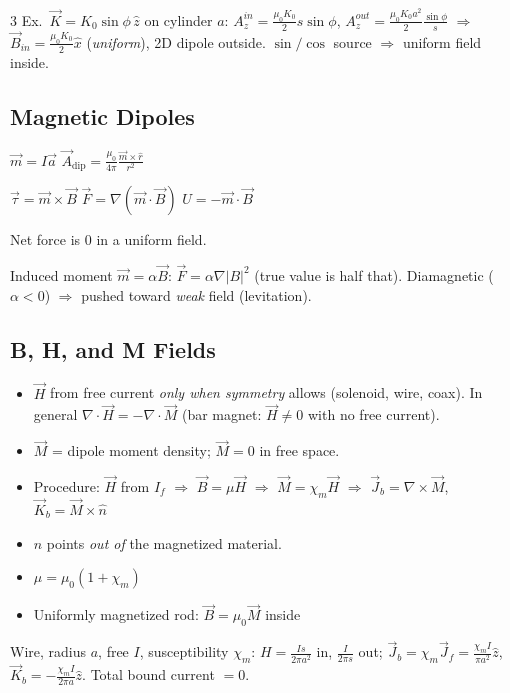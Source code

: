 \documentclass[11pt]{article}
\newcommand{\warn}[1]{\textcolor{red!70!black}{#1}}
\begin{document}
\begin{multicols*}{3}
Ex.\ $\vec K=K_0\sin\phi\,\hat z$ on cylinder $a$: $A_z^{in}=\frac{\mu_0K_0}{2}s\sin\phi$, $A_z^{out}=\frac{\mu_0K_0a^2}{2}\frac{\sin\phi}{s}$ $\Rightarrow$ $\vec B_{in}=\frac{\mu_0K_0}{2}\hat x$ (\emph{uniform}), 2D dipole outside. $\sin/\cos$ source $\Rightarrow$ uniform field inside.

\subsection*{Magnetic Dipoles}

$\vec m=I\vec a$ \hfill $\vec A_\text{dip}=\frac{\mu_0}{4\pi}\frac{\vec m\times\hat r}{r^2}$

$\vec\tau=\vec m\times\vec B$ \quad $\vec F=\nabla(\vec m\cdot\vec B)$ \quad $U=-\vec m\cdot\vec B$

Net force is 0 in a uniform field.

Induced moment $\vec m=\alpha\vec B$: $\vec F=\alpha\nabla|B|^2$ (true value is half that). Diamagnetic ($\alpha<0$) $\Rightarrow$ pushed toward \emph{weak} field (levitation).

\subsection*{B, H, and M Fields}

\begin{itemize}
    \item $\vec H$ from free current \emph{only when symmetry} allows (solenoid, wire, coax). In general $\nabla\cdot\vec H=-\nabla\cdot\vec M$ (bar magnet: $\vec H\neq0$ with no free current).
    \item $\vec M$ = dipole moment density; $\vec M=0$ in free space.
    \item Procedure: $\vec H$ from $I_f$ $\Rightarrow$ $\vec B=\mu\vec H$ $\Rightarrow$ $\vec M=\chi_m\vec H$ $\Rightarrow$ $\vec J_b=\nabla\times\vec M$, $\vec K_b=\vec M\times\hat n$
    \item \warn{$\hat n$ points \emph{out of} the magnetized material.}
    \item $\mu=\mu_0(1+\chi_m)$
    \item Uniformly magnetized rod: $\vec B=\mu_0\vec M$ inside
\end{itemize}

Wire, radius $a$, free $I$, susceptibility $\chi_m$:
$H=\frac{Is}{2\pi a^2}$ in, $\frac{I}{2\pi s}$ out; $\vec J_b=\chi_m\vec J_f=\frac{\chi_mI}{\pi a^2}\hat z$, $\vec K_b=-\frac{\chi_mI}{2\pi a}\hat z$. Total bound current $=0$.


\end{multicols*}
\end{document}

